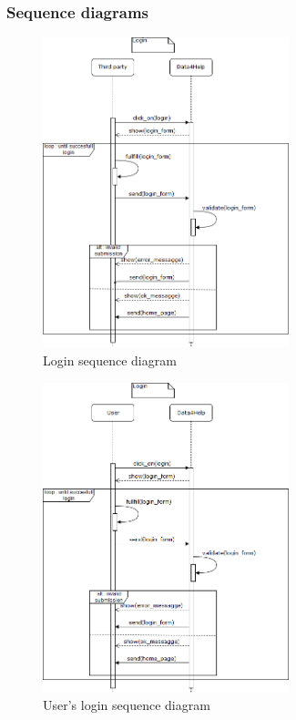 \newpage

{\color{secblue}\subsubsection{Sequence diagrams}}

\begin{figure}[H]
\includegraphics[width=\linewidth, height=9cm, keepaspectratio]{./Images/sequence_diag_login.png}
\centering
\caption{Login sequence diagram}
\end{figure}

\begin{figure}[H]
\includegraphics[width=\linewidth, height=9cm, keepaspectratio]{./Images/sequence_diag_login_user.png}
\centering
\caption{User's login sequence diagram}
\end{figure}

